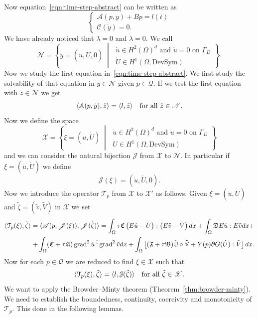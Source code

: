 Now equation~\eqref{eqn:time-step-abstract} can be written as
\begin{equation*}
\begin{cases}
\mathscr{A}(p,\dot y)+Bp=l(t) \\
\mathscr{C}(\dot y)=0.
\end{cases}
\end{equation*}
We have already noticed that $\lambda=0$ and $\dot\lambda=0$. We call
\[
\mathscr{N}=\left\{\dot y=(\dot u,\dot U,0)\;\middle|\;\substack{\text{$\dot u\in H^2(\Omega)^d$ and $\dot u=0$ on $\Gamma_D$}\\\dot U\in H^1(\Omega,\text{DevSym})}\right\}.
\]
Now we study the first equation in~\eqref{eqn:time-step-abstract}. We first study the solvability of that equation in $\dot y\in\mathscr{N}$ given $p\in\mathscr{Q}$. If we test the first equation with $\tilde{z}\in\mathscr{N}$ we get
\[
\langle\mathcal{A}(p,\dot y),\tilde{z}\rangle=\langle l,\tilde{z}\rangle\quad\text{for all $\tilde{z}\in\mathscr{N}$}.
\]
Now we define the space
\[
\mathscr{X}=\left\{\xi=(\dot u,\dot U)\;\middle|\;\substack{\text{$\dot u\in H^2(\Omega)^d$ and $\dot u=0$ on $\Gamma_D$}\\\dot U\in H^1(\Omega,\text{DevSym})}\right\}
\]
and we can consider the natural bijection $\mathcal{J}$ from $\mathscr{X}$ to $\mathscr{N}$. In particular if $\xi=(\dot u,\dot U)$ we define
\[
\mathcal{J}(\xi)=(\dot u,\dot U,0).
\]
Now we introduce the operator $\mathcal{T}_p$ from $\mathscr{X}$ to $\mathscr{X}'$ as follows. Given $\xi=(\dot u,\dot U)$ and $\tilde{\zeta}=(\tilde{v},\tilde{V})$ in $\mathscr{X}$ we set
\[
\begin{split}
\langle\mathcal{T}_p(\xi),\tilde{\zeta}\rangle=\langle\mathscr{A}(p,\mathscr{J}(\xi)),\mathscr{J}(\tilde\zeta)\rangle=\int_\Omega\tau\mathfrak{C}\left(E\dot u-\dot U\right):\left(E\tilde v-\tilde V\right)dx+\int_\Omega\mathfrak{D}E\dot u:E\tilde vdx+\\
+\int_\Omega(\mathfrak{E}+\tau \mathfrak{A})\operatorname{grad}^2\dot u\mathbin{\vdots}\operatorname{grad}^2\tilde vdx+\int_\Omega\left[(\mathfrak{F}+\tau\mathfrak{B})\mathbb{\dot U}\circ\tilde{\mathbb{V}}+Y(p)\partial G(\dot U):\tilde V\right]dx.
\end{split}
\]
Now for each $p\in\mathscr{Q}$ we are reduced to find $\xi\in\mathscr{X}$ such that
\begin{equation}
\label{eqn:T}
\langle\mathcal{T}_p(\xi),\tilde\zeta\rangle=\langle l,\mathcal{J}(\tilde\zeta)\rangle\quad\text{for all $\tilde\zeta\in\mathscr{X}$}.
\end{equation}
We want to apply the Browder--Minty theorem (Theorem~\ref{thm:browder-minty}). We need to establish the boundedness, continuity, coercivity and monotonicity of $\mathcal{T}_p$. This done in the following lemmas.
